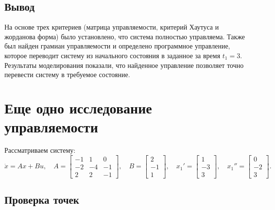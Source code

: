 \subsection{Вывод}

На основе трех критериев (матрица управляемости, критерий Хаутуса и жорданова форма) 
было установлено, что система полностью управляема. 
Также был найден грамиан управляемости и определено программное управление, 
которое переводит систему из начального состояния в заданное за время $t_1=3$. 
Результаты моделирования показали, что найденное управление позволяет точно перевести систему в требуемое состояние.



\section{Еще одно исследование управляемости}

Рассматриваем систему:
\begin{equation*}
    \dot x=Ax+Bu,\quad
    A=\begin{bmatrix}
        -1 & 1 & 0 \\ -2 & -4 & -1 \\ 2 & 2 & -1
    \end{bmatrix},\quad
    B=\begin{bmatrix}
        2 \\ -1 \\ 1
    \end{bmatrix},\quad
    x_1'=\begin{bmatrix}
        1 \\ -3 \\ 3
    \end{bmatrix},\quad
    x_1''=\begin{bmatrix}
        0\\-2\\3
    \end{bmatrix}.
\end{equation*}

\subsection{Проверка точек}

